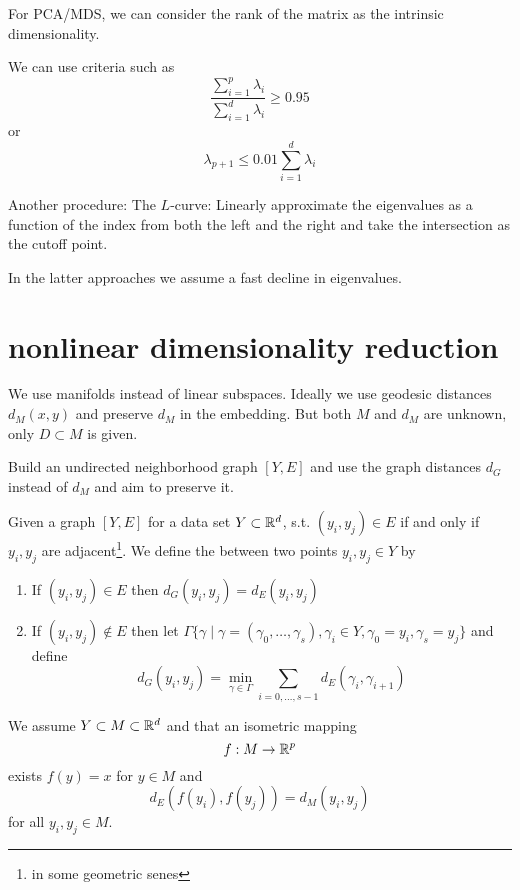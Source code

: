 For PCA/MDS, we can consider the rank of the matrix as the intrinsic dimensionality.

We can use criteria such as 
\[\frac{\sum_{i=1}^p\lambda_i}{\sum_{i=1}^d\lambda_i}\geq 0.95\]
or 
\[\lambda_{p+1} \leq 0.01\sum_{i=1}^d \lambda_i\]

Another procedure: The $L$-curve: Linearly approximate the eigenvalues as a function of the index from both the left and the right and take the intersection as the cutoff point.

In the latter approaches we assume a fast decline in eigenvalues.

\section{nonlinear dimensionality reduction}

We use manifolds instead of linear subspaces. Ideally we use geodesic distances $d_M(x,y)$ and 
preserve $d_M$ in the embedding. But both $M$ and $d_M$ are unknown, only 
$D\subset M$ is given. 

 Build an undirected neighborhood graph $[Y,E]$ and use the graph distances $d_G$
instead of $d_M$ and aim to preserve it.

\begin{definition}\label{def:11} %
    Given a graph $[Y,E]$ for a data set $Y\subset\mathbb{R}^d$, s.t. $(y_i,y_j)\in E$ if and only if $y_i,y_j$ are adjacent\footnote{in some geometric senes}. 
    We define the  between two points $y_i,y_j\in Y$ by 
    \begin{enumerate}
        \item If $(y_i,y_j)\in E$ then $d_G(y_i,y_j)=d_E(y_i,y_j)$
        \item If $(y_i,y_j)\not\in E$ then let $\Gamma\{\gamma\mid \gamma=(\gamma_0,\dots,\gamma_s),\gamma_i\in Y, \gamma_0=y_i,\gamma_s=y_j\}$ and define 
        \[d_G(y_i,y_j)=\min_{\gamma\in\Gamma} \sum_{i=0,\dots,s-1}d_E(\gamma_i,\gamma_{i+1})\]
    \end{enumerate}
\end{definition}

We assume $Y\subset M\subset \mathbb{R}^d$ and that an isometric mapping 
\[f:M\to\mathbb{R}^p\]
exists $f(y)=x$ for $y\in M$ and \[d_E(f(y_i),f(y_j))=d_M(y_i,y_j)\]
for all $y_i,y_j\in M$.

